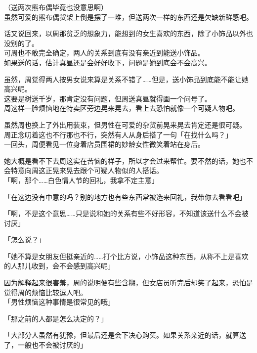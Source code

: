（送两次熊布偶毕竟也没意思啊）\\

虽然可爱的熊布偶货架上倒是摆了一堆，但送两次一样的东西还是欠缺新鲜感吧。

话又说回来，以周那贫乏的想象力，能想到的女生喜欢的东西，除了小饰品以外也没别的了。\\

可周也不敢完全确定，两人的关系到底有没有亲近到能送小饰品。\\

如果送的话，估计真昼还是会好好收下，问题是她到底会不会高兴。

虽然，周觉得两人按男女说来算是关系不错了……但是，送小饰品到底能不能让她高兴呢。\\

这要是树送千岁，那肯定没有问题，但周送真昼就得画一个问号了。\\

周这样一脸烦恼地在特卖区旁边晃来晃去，看上去恐怕就像一个可疑人物吧。

虽然周也换上了外出用装束，但男性在可爱的杂货前晃来晃去肯定还是很可疑。\\

周正念叨着这也不行那也不行，突然有人从身后搭了一句「在找什么吗？」\\

一回头，周便看见一位身着店员围裙的妙龄女性微笑着站在身后。

她大概是看不下去周这实在苦恼的样子，所以才会过来帮忙。要不然的话，她也不会特意向周这正晃来晃去跟个可疑人物似的人搭话。\\

「啊，那个……白色情人节的回礼，我拿不定主意」

「在这边没有中意的吗？别的地方也有些东西常被选来回礼，我带你去看看吧」

「啊，不是这个意思……只是说和她的关系有些不好形容，不知道该送什么不会被讨厌」

「怎么说？」

「她不算是女朋友但挺亲近的……打个比方说，小饰品这种东西，从称不上是喜欢的人那儿收到，会不会感到高兴呢」

因为解释起来很害羞，周的说明便有些含糊，但女店员听完后却笑了起来，恐怕是觉得周的烦恼比较逗人吧。\\

「男性烦恼这种事情是很常见的哦」

「那之前的人都是怎么决定的？」

「大部分人虽然有犹豫，但最后还是会下决心购买。如果关系亲近的话，就算送了，一般也不会被讨厌的」\\

